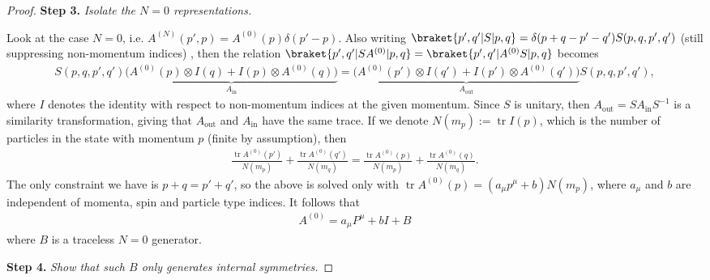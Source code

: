 \begin{proof}
\vspace{3pt}
\noindent\textbf{Step 3.} \textit{Isolate the $N = 0$ representations.}
\vspace{2pt}

Look at the case $N = 0$, i.e. $A^{(N)}(p',p)  = A^{(0)}(p)\delta(p'- p)$. Also writing $ \braket{p',q'|S |p,q} = \delta( p + q - p' - q')S(p,q,p',q') $ (still suppressing non-momentum indices) , then the relation $\braket{p',q'|SA^{(0)}|p,q} = \braket{p',q'|A^{(0)}S|p,q}$ becomes \begin{align}
    S(p,q,p',q') \underbrace{\Big(A^{(0)}(p)\otimes I(q) + I(p)\otimes A^{(0)} (q)\Big)}_{A_{\text{in}}} =  \underbrace{\Big(A^{(0)}(p')\otimes I(q') + I(p')\otimes A^{(0)} (q')\Big)}_{A_{\text{out}}}S(p,q,p',q') ,
\end{align} where $I$ denotes the identity with respect to non-momentum indices at the given momentum. Since $S$ is unitary, then $A_{\text{out}} = SA_{\text{in}}S^{-1} $ is a similarity transformation, giving that $A_{\text{out}}$ and $A_{\text{in}}$ have the same trace. If we denote $N(m_p) := \operatorname{tr}I(p)$, which is the number of particles in the state with momentum $p$ (finite by assumption), then \begin{align}
    \frac{\operatorname{tr} A^{(0)}(p')}{N(m_{p})} +  \frac{\operatorname{tr} A^{(0)}(q')}{N(m_{q})} =  \frac{\operatorname{tr} A^{(0)}(p)}{N(m_{p})}  +  \frac{\operatorname{tr} A^{(0)}(q)}{N(m_{q})} .
\end{align} The only constraint we have is $p + q = p' + q'$, so the above is solved only with $\operatorname{tr} A^{(0)}(p) = (a_\mu p^\mu + b) N(m_p)$, where $a_\mu$ and $b$ are independent of momenta, spin and particle type indices. It follows that  \begin{align}
    A^{(0)} = a_\mu P^\mu + b I + B
\end{align} where $B$ is a traceless $N = 0$ generator. 


\vspace{3pt}
\noindent\textbf{Step 4.} \textit{Show that such $B$ only generates internal symmetries.}
\vspace{2pt}


\end{proof}
